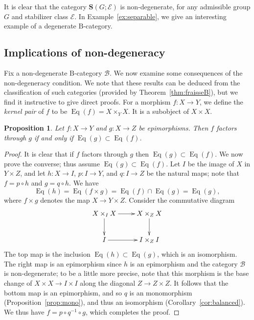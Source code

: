 \documentclass[12pt]{amsart}
\numberwithin{equation}{section}
\newtheorem{proposition}[equation]{Proposition}
\theoremstyle{definition}
\newcommand{\cB}{\mathcal{B}}
\newcommand{\rB}{\mathrm{B}}
\newcommand{\sE}{\mathscr{E}}
\newcommand{\bS}{\mathbf{S}}
\newcommand{\defn}[1]{\emph{#1}}
\DeclareMathOperator{\Eq}{Eq}
\begin{document}
It is clear that the category $\bS(G; \sE)$ is non-degenerate, for any admissible group $G$ and stabilizer class $\sE$. In Example~\ref{ex:separable}, we give an interesting example of a degenerate $\rB$-category.

\subsection{Implications of non-degeneracy}

Fix a non-degenerate $\rB$-category $\cB$. We now examine some consequences of the non-degeneracy condition. We note that these results can be deduced from the classification of such categories (provided by Theorem~\ref{thm:fraisseB}), but we find it instructive to give direct proofs. For a morphism $f \colon X \to Y$, we define the \defn{kernel pair} of $f$ to be $\Eq(f)=X \times_Y X$. It is a subobject of $X \times X$.

\begin{proposition} \label{prop:non-degen-factor}
Let $f \colon X \to Y$ and $g \colon X \to Z$ be epimorphisms. Then $f$ factors through $g$ if and only if $\Eq(g) \subset \Eq(f)$.
\end{proposition}

\begin{proof}
It is clear that if $f$ factors through $g$ then $\Eq(g) \subset \Eq(f)$. We now prove the converse; thus assume $\Eq(g) \subset \Eq(f)$. Let $I$ be the image of $X$ in $Y \times Z$, and let $h \colon X \to I$, $p \colon I \to Y$, and $q \colon I \to Z$ be the natural maps; note that $f=p \circ h$ and $g=q \circ h$. We have
\begin{displaymath}
\Eq(h)=\Eq(f \times g) = \Eq(f) \cap \Eq(g)=\Eq(g),
\end{displaymath}
where $f \times g$ denotes the map $X \to Y \times Z$. Consider the commutative diagram
\begin{displaymath}
\xymatrix{
X \times_I X \ar[r] \ar[d] & X \times_Z X \ar[d] \\
I \ar[r] & I \times_Z I  }
\end{displaymath}
The top map is the inclusion $\Eq(h) \subset \Eq(g)$, which is an isomorphism. The right map is an epimorphism since $h$ is an epimorphism and the category $\cB$ is non-degenerate; to be a little more precise, note that this morphism is the base change of $X \times X \to I \times I$ along the diagonal $Z \to Z \times Z$. It follows that the bottom map is an epimorphism, and so $q$ is an monomorphism (Proposition~\ref{prop:mono}), and thus an isomorphism (Corollary~\ref{cor:balanced}). We thus have $f=p \circ q^{-1} \circ g$, which completes the proof.
\end{proof}
\end{document}
